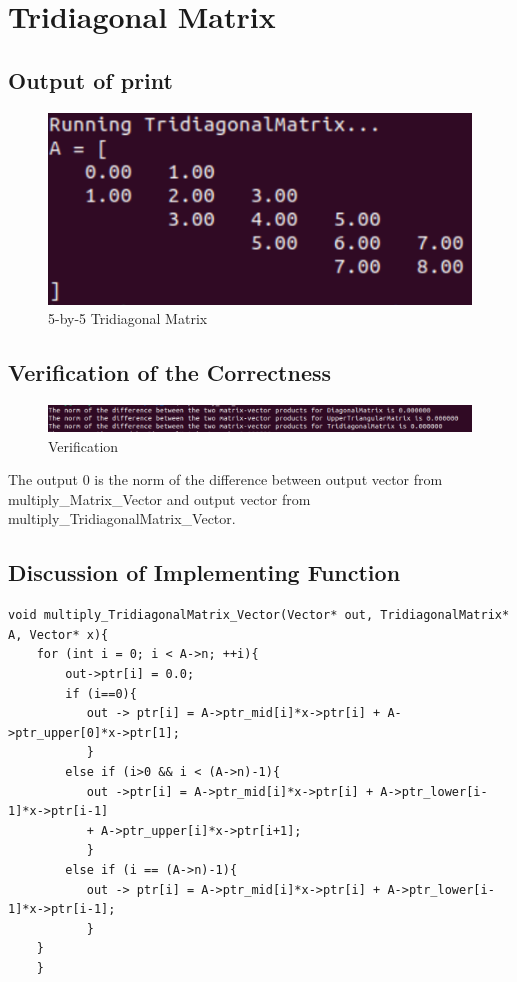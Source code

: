 \documentclass[10pt,a4paper]{article}
\begin{document}
\section{Tridiagonal Matrix}
\subsection{Output of print}

\begin{figure}[!ht]
        \centering \includegraphics[scale=1]{figures/tridiagonal matrix print.png}
        \caption{5-by-5 Tridiagonal Matrix}
\end{figure}


\subsection{Verification of the Correctness}

\begin{figure}[!ht]
        \centering \includegraphics[scale=0.8]{figures/verification.png}
        \caption{Verification}
\end{figure}

The output 0 is the norm of the difference between output vector from multiply\_Matrix\_Vector and output vector from multiply\_TridiagonalMatrix\_Vector.


\subsection{Discussion of Implementing Function}

\begin{lstlisting}[]
void multiply_TridiagonalMatrix_Vector(Vector* out, TridiagonalMatrix* A, Vector* x){ 
    for (int i = 0; i < A->n; ++i){      
        out->ptr[i] = 0.0;      
        if (i==0){          
           out -> ptr[i] = A->ptr_mid[i]*x->ptr[i] + A->ptr_upper[0]*x->ptr[1];      
           }      
        else if (i>0 && i < (A->n)-1){
           out ->ptr[i] = A->ptr_mid[i]*x->ptr[i] + A->ptr_lower[i-1]*x->ptr[i-1]
           + A->ptr_upper[i]*x->ptr[i+1];      
           }       
        else if (i == (A->n)-1){          
           out -> ptr[i] = A->ptr_mid[i]*x->ptr[i] + A->ptr_lower[i-1]*x->ptr[i-1];      
           }    
    }
    }
\end{lstlisting}
\end{document}
